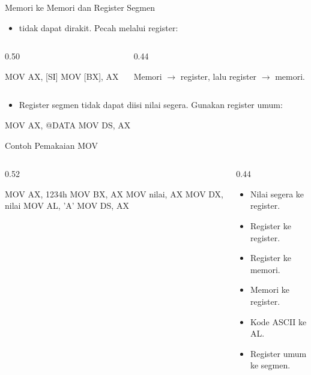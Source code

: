 \documentclass[aspectratio=169,11pt]{beamer}
\begin{document}
\begin{frame}[fragile]{Memori ke Memori dan Register Segmen}
\small
\begin{itemize}
    \item {} tidak dapat dirakit. Pecah melalui
          register:
\end{itemize}

\vspace{0.1em}
\begin{columns}[t]
\begin{column}{0.50\textwidth}
\begin{kodeasm}[numbers=none]
MOV AX, [SI]
MOV [BX], AX
\end{kodeasm}
\end{column}
\begin{column}{0.44\textwidth}
{\footnotesize Memori $\rightarrow$ register, lalu register
$\rightarrow$ memori.\par}
\end{column}
\end{columns}

\vspace{0.15em}
\begin{itemize}
    \item Register segmen tidak dapat diisi nilai segera. Gunakan
          register umum:
\end{itemize}

\begin{kodeasm}[numbers=none]
MOV AX, @DATA
MOV DS, AX
\end{kodeasm}
\end{frame}

\begin{frame}[fragile]{Contoh Pemakaian MOV}
\begin{columns}[t]
\begin{column}{0.52\textwidth}
\begin{kodeasm}
MOV AX, 1234h
MOV BX, AX
MOV nilai, AX
MOV DX, nilai
MOV AL, 'A'
MOV DS, AX
\end{kodeasm}
\end{column}
\begin{column}{0.44\textwidth}
\footnotesize
\begin{itemize}
    \item Nilai segera ke register.
    \item Register ke register.
    \item Register ke memori.
    \item Memori ke register.
    \item Kode ASCII ke AL.
    \item Register umum ke segmen.
\end{itemize}
\end{column}
\end{columns}
\end{frame}
\end{document}

